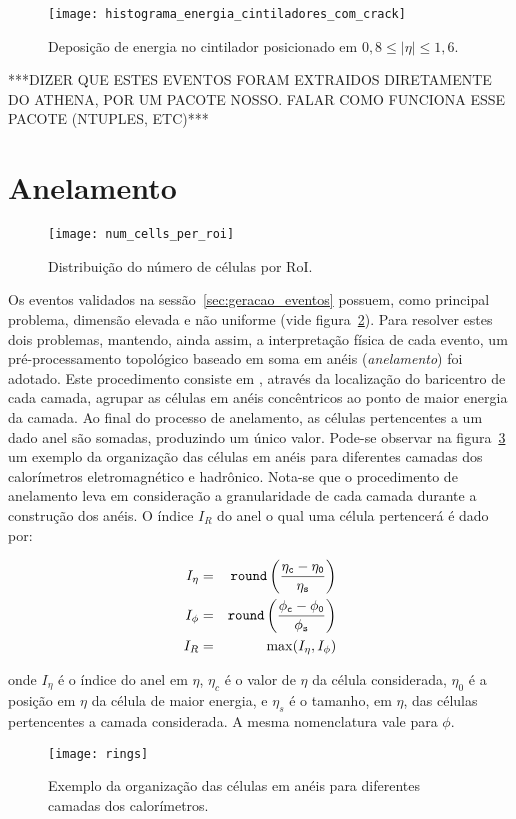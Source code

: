 \begin{figure}
\centering 
\texttt{[image: histograma\_energia\_cintiladores\_com\_crack]}
\caption{Deposição de energia no cintilador posicionado em $0,8 \leq | \eta | \leq 1,6$.} 
\label{fig:deposicao_energia_cintiladores} 
\end{figure} 

***DIZER QUE ESTES EVENTOS FORAM EXTRAIDOS DIRETAMENTE DO ATHENA, POR UM PACOTE NOSSO. FALAR COMO FUNCIONA ESSE PACOTE (NTUPLES, ETC)***

\section{Anelamento}

\begin{figure}
\centering 
\texttt{[image: num\_cells\_per\_roi]}
\caption{Distribuição do número de células por RoI.} 
\label{fig:distribuicao_numero_celulas_roi} 
\end{figure} 


Os eventos validados na sessão~\ref{sec:geracao_eventos} possuem, como principal problema, dimensão elevada e não uniforme (vide figura~\ref{fig:distribuicao_numero_celulas_roi}). Para resolver estes dois problemas, mantendo, ainda assim, a interpretação física de cada evento, um pré-processamento topológico baseado em soma em anéis \cite{bib:dsc_rabello} (\emph{anelamento}) foi adotado. Este procedimento consiste em , através da localização do baricentro de cada camada, agrupar as células em anéis concêntricos ao ponto de maior energia da camada. Ao final do processo de anelamento, as células pertencentes a um dado anel são somadas, produzindo um único valor. Pode-se observar na figura~\ref{fig:exemplo_organizacao_aneis} um exemplo da organização das células em anéis para diferentes camadas dos calorímetros eletromagnético e hadrônico. Nota-se que o procedimento de anelamento leva em consideração a granularidade de cada camada durante a construção dos anéis. O índice $I_R$ do anel o qual uma célula pertencerá é dado por:

\begin{eqnarray}
I_{\eta} &=& \tt{round} \left ( \frac{\eta_c - \eta_0}{\eta_s} \right ) \\
I_{\phi} &=& \tt{round} \left ( \frac{\phi_c - \phi_0}{\phi_s} \right ) \\
I_R &=& \max(I_{\eta}, I_{\phi})
\end{eqnarray}

\noindent onde $I_{\eta}$ é o índice do anel em $\eta$, $\eta_c$ é o valor de $\eta$ da célula considerada, $\eta_0$ é a posição em $\eta$ da célula de maior energia, e $\eta_s$ é o tamanho, em $\eta$, das células pertencentes a camada considerada. A mesma nomenclatura vale para $\phi$.

\begin{figure}
\centering 
\texttt{[image: rings]}
\caption{Exemplo da organização das células em anéis para diferentes camadas dos calorímetros.} 
\label{fig:exemplo_organizacao_aneis} 
\end{figure} 


